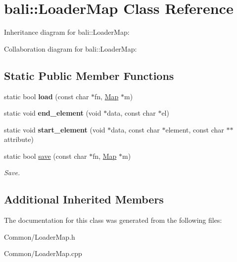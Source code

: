 \hypertarget{classbali_1_1_loader_map}{\section{bali\-:\-:Loader\-Map Class Reference}
\label{classbali_1_1_loader_map}
}


Inheritance diagram for bali\-:\-:Loader\-Map\-:


Collaboration diagram for bali\-:\-:Loader\-Map\-:
\subsection*{Static Public Member Functions}
\begin{DoxyCompactItemize}
\item 
\hypertarget{classbali_1_1_loader_map_ab47f183c7b7d073a0adb78d49d4533a2}{static bool {\bfseries load} (const char $\ast$fn, \hyperlink{classbali_1_1_map}{Map} $\ast$m)}\label{classbali_1_1_loader_map_ab47f183c7b7d073a0adb78d49d4533a2}

\item 
\hypertarget{classbali_1_1_loader_map_afcccc556cd940adf9befc2e2879dae3f}{static void {\bfseries end\-\_\-element} (void $\ast$data, const char $\ast$el)}\label{classbali_1_1_loader_map_afcccc556cd940adf9befc2e2879dae3f}

\item 
\hypertarget{classbali_1_1_loader_map_a8d0bfc92176465fc6e28fcbbed7902fd}{static void {\bfseries start\-\_\-element} (void $\ast$data, const char $\ast$element, const char $\ast$$\ast$attribute)}\label{classbali_1_1_loader_map_a8d0bfc92176465fc6e28fcbbed7902fd}

\item 
\hypertarget{classbali_1_1_loader_map_a31776c6de1d5cdaafb8b382129f96d07}{static bool \hyperlink{classbali_1_1_loader_map_a31776c6de1d5cdaafb8b382129f96d07}{save} (const char $\ast$fn, \hyperlink{classbali_1_1_map}{Map} $\ast$m)}\label{classbali_1_1_loader_map_a31776c6de1d5cdaafb8b382129f96d07}

\begin{DoxyCompactList}\small\item\em Save. \end{DoxyCompactList}\end{DoxyCompactItemize}
\subsection*{Additional Inherited Members}


The documentation for this class was generated from the following files\-:\begin{DoxyCompactItemize}
\item 
Common/Loader\-Map.\-h\item 
Common/Loader\-Map.\-cpp\end{DoxyCompactItemize}
